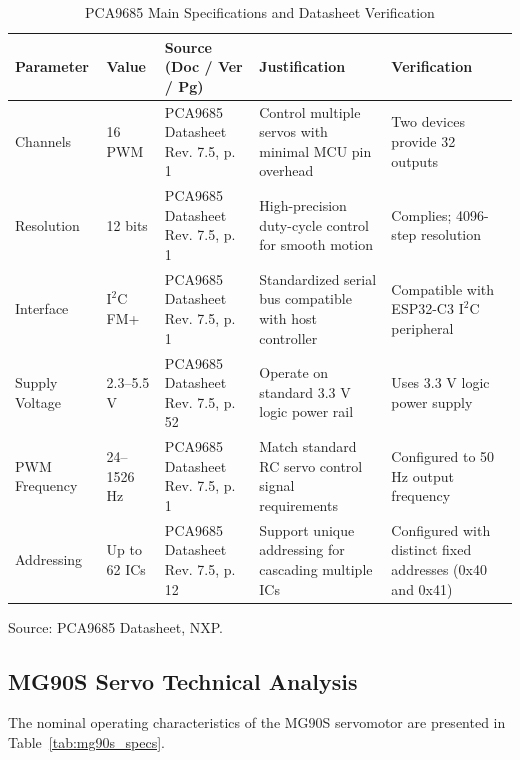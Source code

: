 \documentclass[lettersize,journal]{IEEEtran}
\begin{document}
	\begin{table}[!t]
		\centering
		\caption{PCA9685 Main Specifications and Datasheet Verification}
		\label{tab:pca9685_specs}
		\scriptsize
		
		\setlength{\tabcolsep}{2pt}
		\renewcommand{\arraystretch}{1.1}
		
		\begin{tabularx}{\columnwidth}{@{}P{1.5cm} P{1.4cm} P{2.2cm} X X@{}}
			\toprule
			\textbf{Parameter} & \textbf{Value} & \textbf{Source (Doc / Ver / Pg)} & \textbf{Justification} & \textbf{Verification} \\
			\midrule
			
			Channels & 
			16 PWM & 
			PCA9685 Datasheet Rev. 7.5, p. 1 & 
			Control multiple servos with minimal MCU pin overhead & 
			Two devices provide 32 outputs \\
			
			Resolution & 
			12 bits & 
			PCA9685 Datasheet Rev. 7.5, p. 1 & 
			High-precision duty-cycle control for smooth motion & 
			Complies; 4096-step resolution \\
			
			Interface & 
			$\text{I}^2\text{C}$ FM+ & 
			PCA9685 Datasheet Rev. 7.5, p. 1 & 
			Standardized serial bus compatible with host controller & 
			Compatible with ESP32-C3 $\text{I}^2\text{C}$ peripheral \\
			
			Supply Voltage & 
			2.3--5.5 V & 
			PCA9685 Datasheet Rev. 7.5, p. 52 & 
			Operate on standard 3.3 V logic power rail & 
			Uses 3.3 V logic power supply \\
			
			PWM Frequency & 
			24--1526 Hz & 
			PCA9685 Datasheet Rev. 7.5, p. 1 & 
			Match standard RC servo control signal requirements & 
			Configured to 50 Hz output frequency \\
			
			Addressing & 
			Up to 62 ICs & 
			PCA9685 Datasheet Rev. 7.5, p. 12 & 
			Support unique addressing for cascading multiple ICs & 
			Configured with distinct fixed addresses (0x40 and 0x41) \\
			
			\bottomrule
		\end{tabularx}
	\end{table}
	
	Source: PCA9685 Datasheet, NXP. \cite{pca9685}
	
	
	\subsection{MG90S Servo Technical Analysis}
	The nominal operating characteristics of the MG90S servomotor are presented in Table~\ref{tab:mg90s_specs}.
	
\end{document}
